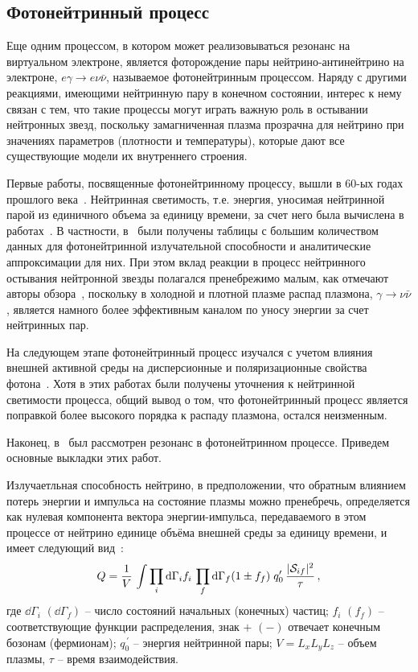 \subsection{Фотонейтринный процесс}
Еще одним процессом, в котором может реализовываться резонанс на виртуальном электроне, является фоторождение пары нейтрино-антинейтрино на электроне, $e\gamma\to e\nu\bar\nu$, называемое фотонейтринным процессом. Наряду с другими реакциями, имеющими нейтринную пару в конечном состоянии, интерес к нему связан с тем, что такие процессы могут играть важную роль в остывании нейтронных звезд, поскольку замагниченная плазма прозрачна для нейтрино при значениях параметров (плотности и температуры), которые дают все существующие модели их внутреннего строения.

Первые работы, посвященные фотонейтринному процессу, вышли в 60-ых годах прошлого века~\cite{Ritus:1961,Chiu:1961}. Нейтринная светимость, т.е. энергия, уносимая нейтринной парой из единичного объема за единицу времени, за счет него была вычислена в работах~\cite{Beaudet:1967,Dicus:1972,Munakata:1985,Shindler:1987,Itoh:1989,Itoh:1996,Skobelev:2000}. В частности, в~\cite{Itoh:1989,Itoh:1996} были получены таблицы с большим количеством данных для фотонейтринной излучательной способности и аналитические аппроксимации для них. При этом вклад реакции в процесс нейтринного остывания нейтронной звезды полагался пренебрежимо малым, как отмечают авторы обзора~\cite{Yakovlev2001}, поскольку в холодной и плотной плазме распад плазмона, $\gamma\to\nu\bar\nu$, является намного более эффективным каналом по уносу энергии за счет нейтринных пар.

На следующем этапе фотонейтринный процесс изучался с учетом влияния внешней активной среды на дисперсионные и поляризационные свойства фотона~\cite{RCh:2008,Borisov:2012,RumChMik}. Хотя в этих работах были получены уточнения к нейтринной светимости процесса, общий вывод о том, что фотонейтринный процесс является поправкой более высокого порядка к распаду плазмона, остался неизменным.

Наконец, в~\cite{Chistyakov:2014cga,qfthep2017} был рассмотрен резонанс в фотонейтринном процессе. Приведем основные выкладки этих работ.

Излучаетльная способность нейтрино, в предположении, что обратным влиянием потерь энергии и импульса на состояние 
плазмы можно пренебречь, определяется как нулевая компонента вектора энергии-импульса, передаваемого в этом 
процессе от нейтрино единице объёма внешней среды за единицу времени, и имеет 
следующий вид~\textcolor{red}{\cite{Yakovlev2001, Gvozdev:2002}}:
%                                                   
\begin{eqnarray}
\label{lumin}
Q = \frac{1}{V}\, \int \prod \limits_{i} \mathrm{d} \Gamma_i f_i \,
\prod \limits_{f} \mathrm{d} \Gamma_f (1\pm f_f) \; q'_0\,
\frac{|{\cal S}_{if}|^2}{\tau}\, ,
\end{eqnarray}
\noindent где $\dd \Gamma_i$ $(\dd \Gamma_f)$ -- число состояний начальных 
(конечных) частиц; $f_i$ $(f_f)$ -- соответствующие функции распределения, 
знак  $+$ $(-)$ отвечает конечным бозонам (фермионам); 
$q^{\, \prime}_0$ -- энергия нейтринной пары; $V = L_x L_y L_z$ -- объем плазмы, $\tau$ -- время 
взаимодействия.

